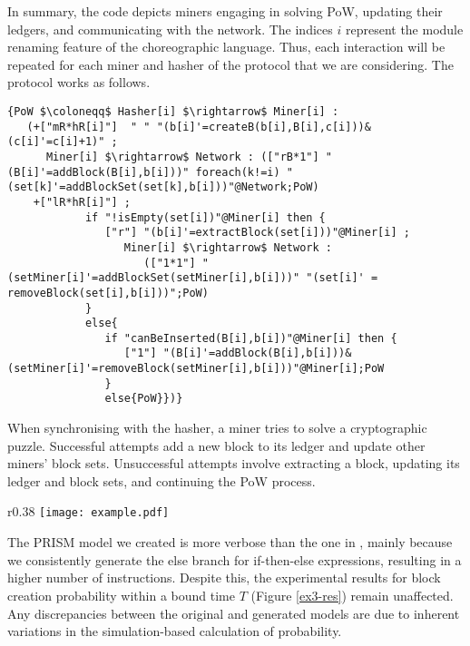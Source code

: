 \textcolor{red}{} {In summary, the code depicts miners engaging in
  solving PoW, updating their ledgers, and communicating with the
  network.  The indices $i$ represent the module renaming feature of
  the choreographic language. Thus, each interaction will be repeated
  for each miner and hasher of the protocol that we are
  considering. The protocol works as follows. 
  \begin{lstlisting}[style=chor-color,breaklines=true, postbreak=\mbox{\textcolor{red}{$\hookrightarrow$}\space},caption={Choreography for the Proof of Work Bitcoin Protocol},captionpos=b,label={ex3-code}]
   {PoW $\coloneqq$ Hasher[i] $\rightarrow$ Miner[i] :
   (+["mR*hR[i]"]  " " "(b[i]'=createB(b[i],B[i],c[i]))&(c[i]'=c[i]+1)" ; 
      Miner[i] $\rightarrow$ Network : (["rB*1"] "(B[i]'=addBlock(B[i],b[i]))" foreach(k!=i) "(set[k]'=addBlockSet(set[k],b[i]))"@Network;PoW)
    +["lR*hR[i]"] ; 
            if "!isEmpty(set[i])"@Miner[i] then { 
               ["r"] "(b[i]'=extractBlock(set[i]))"@Miner[i] ;  
                  Miner[i] $\rightarrow$ Network : 
                     (["1*1"] "(setMiner[i]'=addBlockSet(setMiner[i],b[i]))" "(set[i]' = removeBlock(set[i],b[i]))";PoW) 
            }
            else{
               if "canBeInserted(B[i],b[i])"@Miner[i] then { 
                  ["1"] "(B[i]'=addBlock(B[i],b[i]))&(setMiner[i]'=removeBlock(setMiner[i],b[i]))"@Miner[i];PoW 
               }
               else{PoW}})} 
   \end{lstlisting}
   \vspace{-0.15cm}

  When synchronising with
  the hasher, a miner tries to solve a cryptographic
  puzzle. Successful attempts add a new block to its ledger and update other miners' block sets. Unsuccessful attempts involve extracting a block, updating its ledger and block sets, and continuing the PoW process.}
  \begin{wrapfigure}{r}{0.38\textwidth}
   \vspace{-0.75cm}
   \centering
   \texttt{[image: example.pdf]}	
   \vspace{-0.35cm}
   \caption{}
   \label{ex3-res}
   \vspace{-0.75cm}
\end{wrapfigure}
The PRISM model we created is more verbose than the one in \cite{DBLP:journals/concurrency/BistarelliNGLMV23}, mainly because we consistently generate the else branch for if-then-else expressions, resulting in a higher number of instructions. Despite this, the experimental results for block creation probability within a bound time $T$ (Figure \ref{ex3-res}) remain unaffected. Any discrepancies between the original and generated models are due to inherent variations in the simulation-based calculation of probability.


